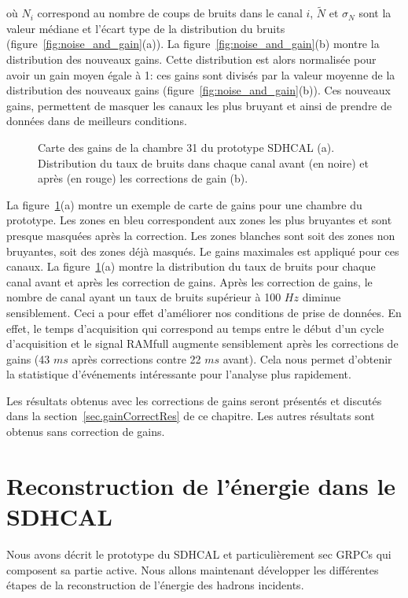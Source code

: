 où $N_i$ correspond au nombre de coups de bruits dans le canal $i$, $\tilde N$ et $\sigma_N$ sont la valeur médiane et l'écart type de la distribution du bruits (figure~\ref{fig:noise_and_gain}(a)). La figure~\ref{fig:noise_and_gain}(b) montre la distribution des nouveaux gains. Cette distribution est alors normalisée pour avoir un gain moyen égale à 1: ces gains sont divisés par la valeur moyenne de la distribution des nouveaux gains (figure~\ref{fig:noise_and_gain}(b)). Ces nouveaux gains, permettent de masquer les canaux les plus bruyant et ainsi de prendre de données dans de meilleurs conditions. 
\begin{figure}[!ht]
  \caption{Carte des gains de la chambre 31 du prototype SDHCAL (a). Distribution du taux de bruits dans chaque canal avant (en noire) et après (en rouge) les corrections de gain (b).\label{fig:map_and_rate}}
\end{figure}
La figure~\ref{fig:map_and_rate}(a) montre un exemple de carte de gains pour une chambre du prototype. Les zones en bleu correspondent aux zones les plus bruyantes et sont presque masquées après la correction. Les zones blanches sont soit des zones non bruyantes, soit des zones déjà masqués. Le gains maximales est appliqué pour ces canaux. La figure~\ref{fig:map_and_rate}(a) montre la distribution du taux de bruits pour chaque canal avant et après les correction de gains. Après les correction de gains, le nombre de canal ayant un taux de bruits supérieur à 100 $Hz$ diminue sensiblement. Ceci a pour effet d'améliorer nos conditions de prise de données. En effet, le temps d'acquisition qui correspond au temps entre le début d'un cycle d'acquisition et le signal RAMfull augmente sensiblement après les corrections de gains (43 $ms$ après corrections contre 22 $ms$ avant). Cela nous permet d'obtenir la statistique d’événements intéressante pour l'analyse plus rapidement.

Les résultats obtenus avec les corrections de gains seront présentés et discutés dans la  section~\ref{sec.gainCorrectRes} de ce chapitre. Les autres résultats sont obtenus sans correction de gains.


\section{Reconstruction de l'énergie dans le SDHCAL}
Nous avons décrit le prototype du SDHCAL et particulièrement sec GRPCs qui composent sa partie active. Nous allons maintenant développer les différentes étapes de la reconstruction de l'énergie des hadrons incidents.
